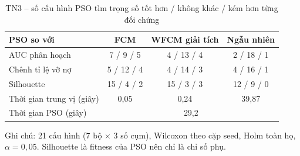 \begin{table}[htbp]
\centering
\caption{TN3 -- số cấu hình PSO tìm trọng số tốt hơn / không khác / kém hơn từng đối chứng}
\label{tab:e8-tong-hop}
\footnotesize
\setlength{\tabcolsep}{3pt}
\begin{tabular}{@{}lccc@{}}
\toprule
PSO so với & FCM & WFCM giải tích & Ngẫu nhiên \\
\midrule
AUC phân hoạch & 7 / 9 / 5 & 4 / 13 / 4 & 2 / 18 / 1 \\
Chênh tỉ lệ vỡ nợ & 5 / 12 / 4 & 4 / 14 / 3 & 4 / 16 / 1 \\
Silhouette & 15 / 4 / 2 & 15 / 3 / 3 & 12 / 9 / 0 \\
\midrule
Thời gian trung vị (giây) & 0,05 & 0,24 & 39,87 \\
Thời gian PSO (giây) & \multicolumn{3}{c}{29,2} \\
\bottomrule
\end{tabular}
\par\smallskip\parbox{\linewidth}{\scriptsize Ghi chú: 21 cấu hình (7 bộ × 3 số cụm), Wilcoxon theo cặp seed, Holm toàn họ, $\alpha = 0{,}05$. Silhouette là fitness của PSO nên chỉ là chỉ số phụ.}
\end{table}
